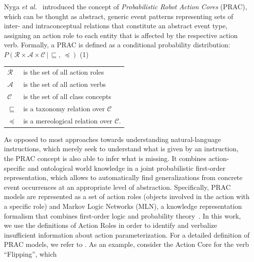 \documentclass[oribibl]{llncs}
\begin{document}
Nyga \emph{et al.}~\cite{nyga12actioncore} introduced the concept of 
\emph{Probabilistic Robot Action Cores} (PRAC), which can be thought as abstract,
generic event patterns representing sets of 
inter- and intraconceptual relations that constitute an abstract 
event type, assigning an action role to each entity that is affected 
by the respective action verb. Formally, a PRAC is defined as a conditional
probability distribution:
$P\left(\mathcal{R}\times\mathcal{A}\times\mathcal{C}\,|\,\sqsubseteq
,\, \preceq \right)\nonumber$ 
\hfill  (1)
{\small
\begin{center} \begin{tabular}{ll}
    $\mathcal{R}$  & is the set of all action roles\\
    $\mathcal{A}$  & is the set of all action verbs\\
    $\mathcal{C}$  & is the set of all class concepts\\
    $\sqsubseteq$ & is a taxonomy relation over $\mathcal{C}$\\
    $\preceq$	& is a mereological relation over $\mathcal{C}$.
\end{tabular}
\end{center}}
As opposed to most approaches towards understanding natural-language 
instructions, which merely seek to understand what is given by an 
instruction, the PRAC concept is also able to infer what is missing. 
It combines action-specific and ontological world knowledge in a 
joint probabilistic first-order representation, which allows to 
automatically find generalizations from concrete event occurrences 
at an appropriate level of abstraction. Specifically, PRAC models 
are represented as a set of action roles (objects involved in the 
action with a specific role) and Markov Logic Networks (MLN), a 
knowledge representation formalism that combines first-order logic 
and probability theory~\cite{DBLP:journals/ml/RichardsonD06}. In this
work, we use the definitions of Action Roles in order to identify and
verbalize insufficient information about action parameterization. For a 
detailed definition of PRAC models, we refer to \cite{nyga12actioncore}.
As an example, consider the Action Core for the verb ``Flipping'', which
\end{document}
